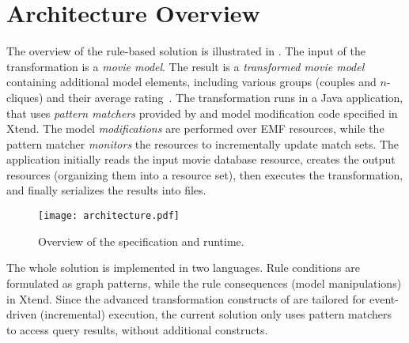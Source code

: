 \section{Architecture Overview}
\label{sec:overview}

The overview of the rule-based solution is illustrated in . The input of the transformation is a \emph{movie model}. The result is a \emph{transformed movie model} containing additional model elements, including various groups (couples and $n$-cliques) and their average rating~\cite{Horn14}. The transformation runs in a Java application, that uses \emph{pattern matchers} provided by \incquery{} and model modification code specified in Xtend.
The model \emph{modifications} are performed over EMF resources, while the pattern matcher \emph{monitors} the resources to incrementally update match sets.
The application initially reads the input movie database resource, creates the output resources (organizing them into a resource set), then executes the transformation, and finally serializes the results into files.

\begin{figure}
	\centering
	\texttt{[image: architecture.pdf]}
	\caption{Overview of the specification and runtime.}\label{fig:overview}
\end{figure}

The whole solution is implemented in two languages. Rule conditions are formulated as \incquery{} graph patterns, while the rule consequences (model manipulations) in Xtend. Since the advanced transformation constructs of \incquery{} are tailored for event-driven (incremental) execution, the current solution only uses pattern matchers to access query results, without additional constructs.